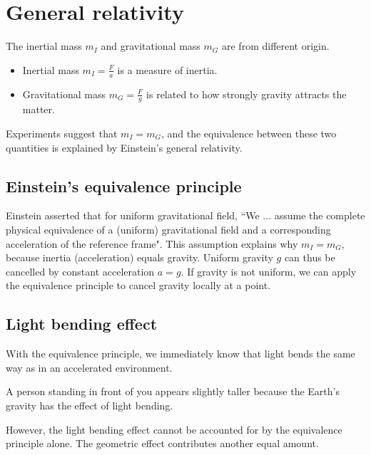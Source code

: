 \documentclass[12pt]{book} %
\numberwithin{equation}{chapter}
\begin{document}
\newpage
{} %
\chapter{General relativity}
The inertial mass $m_{I}$ and gravitational mass $m_{G}$ are from different origin.
\begin{itembox}
\begin{itemize}
\item Inertial mass $m_{I}=\frac{F}{a}$ is a measure of inertia.
\item Gravitational mass $m_{G}=\frac{F}{g}$ is related to how strongly gravity attracts the matter.
\end{itemize}
\end{itembox}
Experiments suggest that $m_{I}=m_{G}$, and the equivalence between these two quantities is explained by Einstein's general relativity.

\section{Einstein's equivalence principle}
Einstein asserted that for uniform gravitational field,\bigskip\newline
``We ... assume the complete physical equivalence of a (uniform) gravitational field and a corresponding acceleration of the reference frame".\bigskip\newline
This assumption explains why $m_{I}=m_{G}$, because inertia (acceleration) equals gravity.\bigskip\newline
Uniform gravity $g$ can thus be cancelled by constant acceleration $a=g$. If gravity is not uniform, we can apply the equivalence principle to cancel gravity locally at a point.

\section{Light bending effect}
With the equivalence principle, we immediately know that light bends the same way as in an accelerated environment.
\begin{example}
A person standing in front of you appears slightly taller because the Earth's gravity has the effect of light bending.
\end{example}
\noindent However, the light bending effect cannot be accounted for by the equivalence principle alone. The geometric effect contributes another equal amount.
\end{document}

